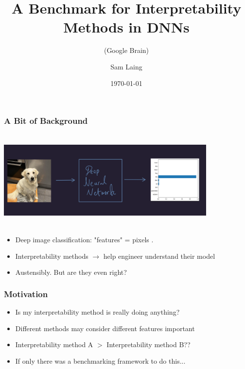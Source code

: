 \documentclass{beamer}
\theoremstyle{mystyle}
\begin{document}
\title{A Benchmark for Interpretability Methods in DNNs}
\subtitle{(Google Brain)}
\author{Sam Laing }
\date{\today}
\begin{frame}
\titlepage
\end{frame}
\begin{frame}
	\frametitle{A Bit of Background}
	\includegraphics[width = 11cm, height = 5cm]{dog_net2.png} \pause
	\begin{itemize}
		\item Deep image classification: "features" = pixels .\pause
		\item Interpretability methods $\to$ help engineer understand their model\pause
		\item Austensibly. But are they even right?
	\end{itemize}
\end{frame}

\begin{frame}
	\frametitle{Motivation}
	\begin{itemize}
		\item Is my interpretability method is really doing anything? \pause
		\item Different methods may consider different features important \pause
		\item Interpretability method A $>$ Interpretability method B??\pause
		\item If only there was a benchmarking framework to do this...
	\end{itemize}
\end{frame}
\end{document}
